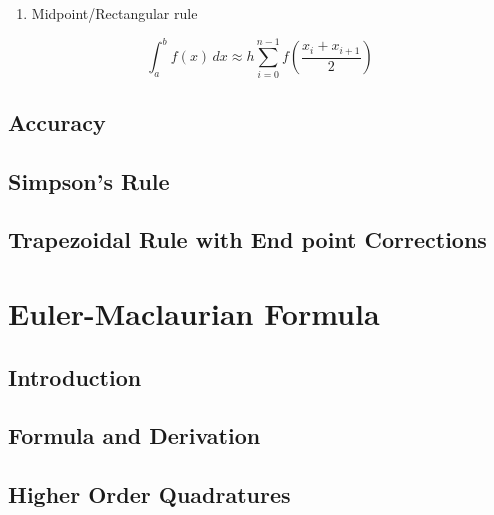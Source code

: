 \documentclass[
]{book}
\providecommand{\tightlist}{%
  \setlength{\itemsep}{0pt}\setlength{\parskip}{0pt}}
\begin{document}
\begin{enumerate}
\def\labelenumi{\arabic{enumi}.}
\setcounter{enumi}{3}
\tightlist
\item
  Midpoint/Rectangular rule
\end{enumerate}

\begin{equation}
\int_a^b f(x) \, dx \approx h \sum_{i=0}^{n-1} f\left( \frac{x_i+x_{i+1}}{2} \right) 
\end{equation}

\hypertarget{accuracy}{%
\subsection{Accuracy}\label{accuracy}}

\hypertarget{simpsons-rule}{%
\subsection{Simpson's Rule}\label{simpsons-rule}}

\hypertarget{trapezoidal-rule-with-end-point-corrections}{%
\subsection{Trapezoidal Rule with End point Corrections}\label{trapezoidal-rule-with-end-point-corrections}}

\hypertarget{euler-maclaurian-formula}{%
\section{Euler-Maclaurian Formula}\label{euler-maclaurian-formula}}

\hypertarget{introduction-1}{%
\subsection{Introduction}\label{introduction-1}}

\hypertarget{formula-and-derivation}{%
\subsection{Formula and Derivation}\label{formula-and-derivation}}

\hypertarget{higher-order-quadratures}{%
\subsection{Higher Order Quadratures}\label{higher-order-quadratures}}
\end{document}
